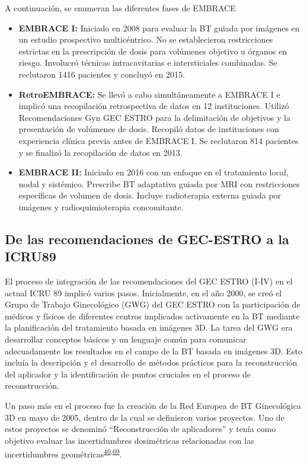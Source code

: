 \documentclass[
  a4paper,
]{scrreprt}
\begin{document}
A continuación, se enumeran las diferentes fases de EMBRACE

\begin{itemize}
\item
  \textbf{EMBRACE I:} Iniciado en 2008 para evaluar la BT guiada por
  imágenes en un estudio prospectivo multicéntrico. No se establecieron
  restricciones estrictas en la prescripción de dosis para volúmenes
  objetivo u órganos en riesgo. Involucró técnicas intracavitarias e
  intersticiales combinadas. Se reclutaron 1416 pacientes y concluyó en
  2015.
\item
  \textbf{RetroEMBRACE:} Se llevó a cabo simultáneamente a EMBRACE I e
  implicó una recopilación retrospectiva de datos en 12 instituciones.
  Utilizó Recomendaciones Gyn GEC ESTRO para la delimitación de
  objetivos y la presentación de volúmenes de dosis. Recopiló datos de
  instituciones con experiencia clínica previa antes de EMBRACE I. Se
  reclutaron 814 pacientes y se finalizó la recopilación de datos en
  2013.
\item
  \textbf{EMBRACE II:} Iniciado en 2016 con un enfoque en el tratamiento
  local, nodal y sistémico. Prescribe BT adaptativa guiada por MRI con
  restricciones específicas de volumen de dosis. Incluye radioterapia
  externa guiada por imágenes y radioquimioterapia concomitante.
\end{itemize}

\hypertarget{de-las-recomendaciones-de-gec-estro-a-la-icru89}{%
\subsection{De las recomendaciones de GEC-ESTRO a la
ICRU89}\label{de-las-recomendaciones-de-gec-estro-a-la-icru89}}

El proceso de integración de las recomendaciones del GEC ESTRO (I-IV) en
el actual ICRU 89 implicó varios pasos. Inicialmente, en el año 2000, se
creó el Grupo de Trabajo Ginecológico (GWG) del GEC ESTRO con la
participación de médicos y físicos de diferentes centros implicados
activamente en la BT mediante la planificación del tratamiento basada en
imágenes 3D. La tarea del GWG era desarrollar conceptos básicos y un
lenguaje común para comunicar adecuadamente los resultados en el campo
de la BT basada en imágenes 3D. Esto incluía la descripción y el
desarrollo de métodos prácticos para la reconstrucción del aplicador y
la identificación de puntos cruciales en el proceso de reconstrucción.

Un paso más en el proceso fue la creación de la Red Europea de BT
Ginecológica 3D en mayo de 2005, dentro de la cual se definieron varios
proyectos. Uno de estos proyectos se denominó ``Reconstrucción de
aplicadores'' y tenía como objetivo evaluar las incertidumbres
dosimétricas relacionadas con las incertidumbres
geométricas\textsuperscript{\protect\hyperlink{ref-tanderup2008}{40},\protect\hyperlink{ref-hellebust2007}{69}}.
\end{document}
